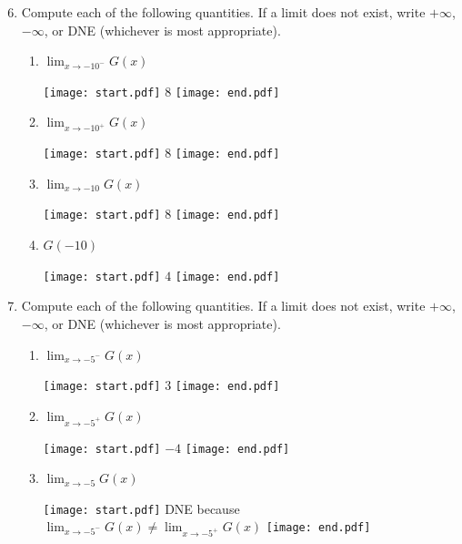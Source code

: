 \documentclass[12pt]{article}
\begin{document}
\begin{enumerate}
\setcounter{enumi}{5}

\item Compute each of the following quantities.  If a limit does not exist, write $+\infty$, $-\infty$, or DNE (whichever is most appropriate). 

\begin{enumerate}

\item $\displaystyle \lim_{x \rightarrow -10^{-}}{G(x)}$

\texttt{[image: start.pdf]}
{{$8$}}
\texttt{[image: end.pdf]}


\item $\displaystyle \lim_{x \rightarrow -10^{+}}{G(x)}$

\texttt{[image: start.pdf]}
{{$8$}}
\texttt{[image: end.pdf]}


\item $\displaystyle \lim_{x \rightarrow -10}{G(x)}$

\texttt{[image: start.pdf]}
{{$8$}}
\texttt{[image: end.pdf]}


\item $G(-10)$

\texttt{[image: start.pdf]}
{{$4$}}
\texttt{[image: end.pdf]}


\end{enumerate}

\item Compute each of the following quantities.  If a limit does not exist, write $+\infty$, $-\infty$, or DNE (whichever is most appropriate). 

\begin{enumerate}

\item $\displaystyle \lim_{x \rightarrow -5^{-}}{G(x)}$

\texttt{[image: start.pdf]}
{{$3$}}
\texttt{[image: end.pdf]}


\item $\displaystyle \lim_{x \rightarrow -5^{+}}{G(x)}$

\texttt{[image: start.pdf]}
{{$-4$}}
\texttt{[image: end.pdf]}


\item $\displaystyle \lim_{x \rightarrow -5}{G(x)}$

\texttt{[image: start.pdf]}
{{DNE because $\displaystyle \lim_{x \rightarrow -5^{-}}{G(x)} \neq \lim_{x \rightarrow -5^{+}}{G(x)}$}}
\texttt{[image: end.pdf]}



\end{enumerate}
\end{enumerate}
\end{document}
